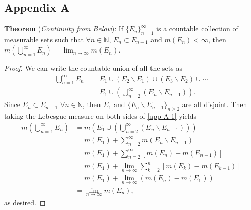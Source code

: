 \documentclass{article}
\newcommand{\N}{\mathbb{N}} %
\begin{document}
\begin{appendices}
	
\section{Appendix A}
\label{appendix:A}
\textbf{Theorem} (\textit{Continuity from Below}): If $\{E_n\}_{n=1}^{\infty}$ is a countable collection of measurable sets such that $\forall n \in \N$, $E_n \subset E_{n+1}$ and $m(E_n) < \infty$, then \\$m\left(\bigcup_{n=1}^{\infty}E_n\right) = \lim_{n \to \infty} m(E_n)$.
\begin{proof}
	We can write the countable union of all the sets as
	\begin{align}
		\bigcup_{n=1}^{\infty}E_n &= E_1 \cup (E_2 \backslash E_1) \cup (E_3 \backslash E_2) \cup \cdots \\
		&= E_1 \cup \left(\bigcup_{n=2}^{\infty} (E_n\backslash E_{n-1})\right). \label{app-A-1}
	\end{align}
	Since $E_n \subset E_{n+1}$ $\forall n \in \N$, then $E_1$ and $\{E_n \backslash E_{n-1}\}_{n \geq 2}$ are all disjoint. Then taking the Lebesgue measure on both sides of \eqref{app-A-1} yields
	\begin{align}
		m\left(\bigcup_{n=1}^{\infty} E_n \right) &= m\left(E_1 \cup \left(\bigcup_{n=2}^{\infty}(E_n \backslash E_{n-1})\right)\right) \\
		&= m(E_1) + \sum_{n=2}^{\infty}m(E_n \backslash E_{n-1}) \\
		&= m(E_1) + \sum_{n=2}^{\infty}\left[m(E_n) - m(E_{n-1})\right] \\
		&= m(E_1) + \lim_{n \to \infty}\sum_{k=2}^{n}\left[m(E_k) - m(E_{k-1})\right] \\
		&= m(E_1) + \lim_{n \to \infty}\left(m(E_n) - m(E_1)\right) \\
		&= \lim_{n \to \infty} m(E_n),
	\end{align}
	as desired.
\end{proof}

\end{appendices}
\end{document}

